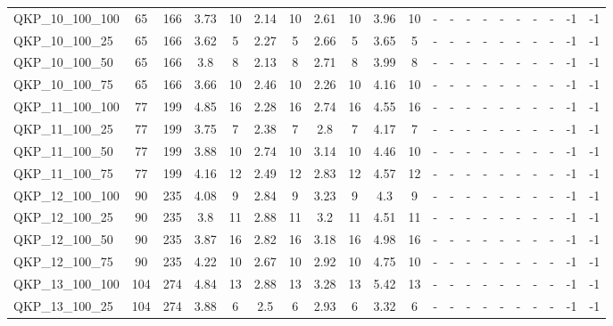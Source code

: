 \begin{sidewaystable}[!ht]
{\begin{tabular}{lcccccccccccccccccccc}
QKP\_10\_100\_100 & 65 & 166 & 3.73 & 10 &  \textcolor{blue2}{2.14} & 10 & 2.61 & 10 & 3.96 & 10 &  - &  - &  - &  - &  - &  - &  - &  - & -1 & -1 \\
QKP\_10\_100\_25 & 65 & 166 & 3.62 & 5 &  \textcolor{blue2}{2.27} & 5 & 2.66 & 5 & 3.65 & 5 &  - &  - &  - &  - &  - &  - &  - &  - & -1 & -1 \\
QKP\_10\_100\_50 & 65 & 166 & 3.8 & 8 &  \textcolor{blue2}{2.13} & 8 & 2.71 & 8 & 3.99 & 8 &  - &  - &  - &  - &  - &  - &  - &  - & -1 & -1 \\
QKP\_10\_100\_75 & 65 & 166 & 3.66 & 10 & 2.46 & 10 &  \textcolor{blue2}{2.26} & 10 & 4.16 & 10 &  - &  - &  - &  - &  - &  - &  - &  - & -1 & -1 \\
QKP\_11\_100\_100 & 77 & 199 & 4.85 & 16 &  \textcolor{blue2}{2.28} & 16 & 2.74 & 16 & 4.55 & 16 &  - &  - &  - &  - &  - &  - &  - &  - & -1 & -1 \\
QKP\_11\_100\_25 & 77 & 199 & 3.75 & 7 &  \textcolor{blue2}{2.38} & 7 & 2.8 & 7 & 4.17 & 7 &  - &  - &  - &  - &  - &  - &  - &  - & -1 & -1 \\
QKP\_11\_100\_50 & 77 & 199 & 3.88 & 10 &  \textcolor{blue2}{2.74} & 10 & 3.14 & 10 & 4.46 & 10 &  - &  - &  - &  - &  - &  - &  - &  - & -1 & -1 \\
QKP\_11\_100\_75 & 77 & 199 & 4.16 & 12 &  \textcolor{blue2}{2.49} & 12 & 2.83 & 12 & 4.57 & 12 &  - &  - &  - &  - &  - &  - &  - &  - & -1 & -1 \\
QKP\_12\_100\_100 & 90 & 235 & 4.08 & 9 &  \textcolor{blue2}{2.84} & 9 & 3.23 & 9 & 4.3 & 9 &  - &  - &  - &  - &  - &  - &  - &  - & -1 & -1 \\
QKP\_12\_100\_25 & 90 & 235 & 3.8 & 11 &  \textcolor{blue2}{2.88} & 11 & 3.2 & 11 & 4.51 & 11 &  - &  - &  - &  - &  - &  - &  - &  - & -1 & -1 \\
QKP\_12\_100\_50 & 90 & 235 & 3.87 & 16 &  \textcolor{blue2}{2.82} & 16 & 3.18 & 16 & 4.98 & 16 &  - &  - &  - &  - &  - &  - &  - &  - & -1 & -1 \\
QKP\_12\_100\_75 & 90 & 235 & 4.22 & 10 &  \textcolor{blue2}{2.67} & 10 & 2.92 & 10 & 4.75 & 10 &  - &  - &  - &  - &  - &  - &  - &  - & -1 & -1 \\
QKP\_13\_100\_100 & 104 & 274 & 4.84 & 13 &  \textcolor{blue2}{2.88} & 13 & 3.28 & 13 & 5.42 & 13 &  - &  - &  - &  - &  - &  - &  - &  - & -1 & -1 \\
QKP\_13\_100\_25 & 104 & 274 & 3.88 & 6 &  \textcolor{blue2}{2.5} & 6 & 2.93 & 6 & 3.32 & 6 &  - &  - &  - &  - &  - &  - &  - &  - & -1 & -1 \\

\end{tabular}}
\end{sidewaystable}
